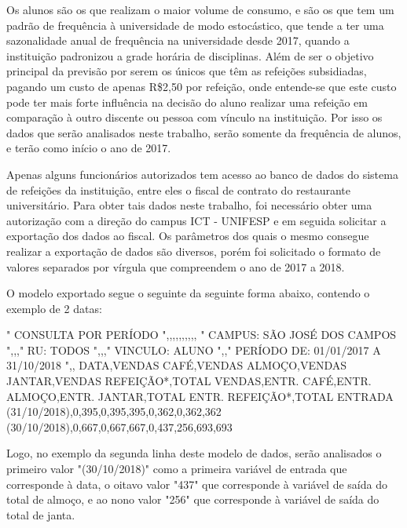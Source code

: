 \documentclass[	12pt, Times, openright, twoside, a4paper, english, brazil]{abntex2}
\begin{document}
          Os alunos são os que realizam o maior volume de consumo, e são os que tem um padrão de frequência à universidade de modo estocástico, que tende a ter uma sazonalidade anual de frequência na universidade desde 2017, quando a instituição padronizou a grade horária de disciplinas.  Além de ser o objetivo principal da previsão por serem os únicos que têm as refeições subsidiadas, pagando um custo de apenas R\$2,50 por refeição, onde entende-se que este custo pode ter mais forte influência na decisão do aluno realizar uma refeição em comparação à outro discente ou pessoa com vínculo na instituição. Por isso os dados que serão analisados neste trabalho, serão somente da frequência de alunos, e terão como início o ano de 2017. 

          Apenas alguns funcionários autorizados tem acesso ao banco de dados do sistema de refeições da instituição, entre eles o fiscal de contrato do restaurante universitário. Para obter tais dados neste trabalho, foi necessário obter uma autorização com a direção do campus ICT - UNIFESP e em seguida solicitar a exportação dos dados ao fiscal. Os parâmetros dos quais o mesmo consegue realizar a exportação de dados são diversos, porém foi solicitado o formato de valores separados por vírgula que compreendem o ano de 2017 a 2018.

          O modelo exportado segue o seguinte da seguinte forma abaixo, contendo o exemplo de 2 datas: \\
          \begin{algorithm}[H]
          "
          CONSULTA POR PERÍODO                    ",,,,,,,,,,
          "
          CAMPUS: SÃO JOSÉ DOS CAMPOS                    ",,,"
          RU: TODOS                    ",,,"
          VINCULO: ALUNO                    ",,"
          PERÍODO DE: 01/01/2017 A 31/10/2018                        ",,
          DATA,VENDAS CAFÉ,VENDAS ALMOÇO,VENDAS JANTAR,VENDAS REFEIÇÃO*,TOTAL VENDAS,ENTR. CAFÉ,ENTR. ALMOÇO,ENTR. JANTAR,TOTAL ENTR. REFEIÇÃO*,TOTAL ENTRADA
          (31/10/2018),0,395,0,395,395,0,362,0,362,362
          (30/10/2018),0,667,0,667,667,0,437,256,693,693
          \end{algorithm}

          Logo, no exemplo da segunda linha deste modelo de dados, serão analisados o primeiro valor "(30/10/2018)" como a primeira variável de entrada que corresponde à data, o oitavo valor "437" que corresponde à variável de saída do total de almoço, e ao nono valor "256" que corresponde à variável de saída do total de janta.
\end{document}
